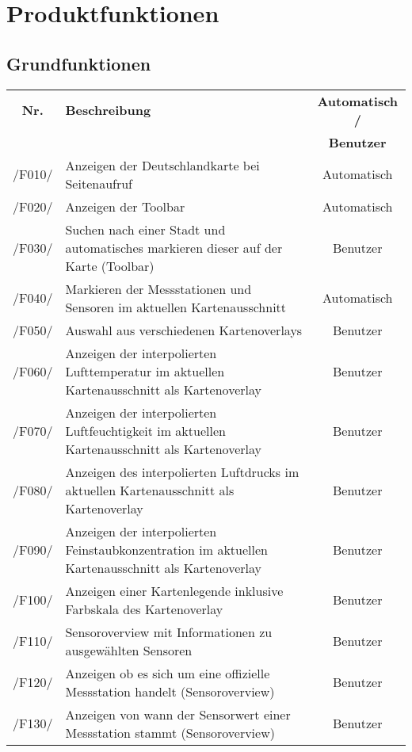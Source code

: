 \clearpage
\section{Produktfunktionen}
\subsection{Grundfunktionen}
\begin{tabularx}{\textwidth}{| c | X | c |}
\hline
        \textbf{Nr.} & 
        \textbf{Beschreibung} & 
        \textbf{Automatisch /} \\
        & & \textbf{Benutzer} \\
        \hline
        /F010/ & Anzeigen der Deutschlandkarte bei Seitenaufruf & Automatisch \\
        \hline
        /F020/ & Anzeigen der Toolbar & Automatisch \\
        \hline
        /F030/ & Suchen nach einer Stadt und automatisches markieren dieser auf der Karte (Toolbar) & Benutzer \\
        \hline
        /F040/ & Markieren der Messstationen und Sensoren im aktuellen Kartenausschnitt & Automatisch \\
        \hline
        /F050/ & Auswahl aus verschiedenen Kartenoverlays & Benutzer \\
        \hline
        /F060/ & Anzeigen der interpolierten Lufttemperatur im aktuellen Kartenausschnitt als Kartenoverlay & Benutzer \\
        \hline
        /F070/ & Anzeigen der interpolierten Luftfeuchtigkeit im aktuellen Kartenausschnitt als Kartenoverlay & Benutzer \\
        \hline
        /F080/ & Anzeigen des interpolierten Luftdrucks im aktuellen Kartenausschnitt als Kartenoverlay & Benutzer \\
        \hline
        /F090/ & Anzeigen der interpolierten Feinstaubkonzentration im aktuellen Kartenausschnitt als Kartenoverlay & Benutzer \\
        \hline
        /F100/ & Anzeigen einer Kartenlegende inklusive Farbskala des Kartenoverlay & Benutzer \\
        \hline
        /F110/ & Sensoroverview mit Informationen zu ausgewählten Sensoren & Benutzer \\
        \hline
        /F120/ & Anzeigen ob es sich um eine offizielle Messstation handelt (Sensoroverview) & Benutzer \\
        \hline
        /F130/ & Anzeigen von wann der Sensorwert einer Messstation stammt (Sensoroverview) & Benutzer \\

\end{tabularx}
